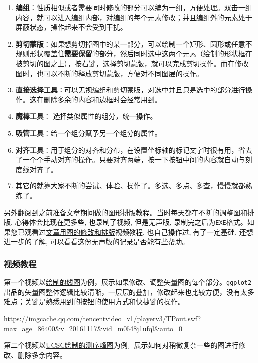 \documentclass[]{article}
\providecommand{\tightlist}{%
  \setlength{\itemsep}{0pt}\setlength{\parskip}{0pt}}
\numberwithin{figure}{section}
\numberwithin{table}{section}
\theoremstyle{definition}
\theoremstyle{definition}
\theoremstyle{definition}
\theoremstyle{remark}
\begin{document}
\begin{enumerate}
\def\labelenumi{\arabic{enumi}.}
\tightlist
\item
  \textbf{编组}：性质相似或者需要同时修改的部分可以编为一组，方便处理。双击一组内容，就可以进入编组内部，对编组的每个元素修改；并且编组外的元素处于屏蔽状态，操作起来不会受到干扰。
\item
  \textbf{剪切蒙版}：如果想剪切掉图中的某一部分，可以绘制一个矩形、圆形或任意不规则形状覆盖住\textbf{需要保留}的部分，然后同时选中这两个元素（绘制的形状框在被剪切的图之上），按右键，选择剪切蒙版，就可以完成剪切操作。而在修改图时，也可以不断的释放剪切蒙版，方便对不同图层的操作。
\item
  \textbf{直接选择工具}：可以无视编组和剪切蒙版，对选中并且只是选中的部分进行操作。这在删除多余的内容和边框时会经常用到。
\item
  \textbf{魔棒工具}： 选择类似属性的组分，统一操作。
\item
  \textbf{吸管工具}：给一个组分赋予另一个组分的属性。
\item
  \textbf{对齐工具}：用于组分的对齐和分布，在设置坐标轴的标记文字时很有用，省去了一个个手动对齐的操作。只要对齐两端，按一下按钮中间的内容就自动与刻度线对齐了。
\item
  其它的就靠大家不断的尝试、体验、操作了。多选、多点、多查，慢慢就都熟练了。
\end{enumerate}

另外翻阅到之前准备文章期间做的图形排版教程。当时每天都在不断的调整图和排版,
心得体会比现在更多些, 也录制了视频, 但是无声版,
录制完之后为\texttt{EXE}格式。如果您已观看过\href{http://mp.weixin.qq.com/s/IJNyhinakY0lSXgCN7b9ug}{文章用图的修改和排版}视频教程,
也自己操作过, 有了一定基础, 还想进一步的了解,
可以看看这份无声版的记录是否能有些帮助。

\subsubsection{视频教程}

第一个视频以\href{http://mp.weixin.qq.com/s/D0b1gBoho5bnuDdsBRpA4g}{绘制的线图}为例，展示如果修改、调整矢量图的每个部分。\texttt{ggplot2}出品的矢量图整体逻辑比较清晰，一层层的叠加，修改起来也比较方便，没有太多难点；关键是熟悉用到的按钮的使用方式和快捷键的操作。

\url{https://imgcache.qq.com/tencentvideo_v1/playerv3/TPout.swf?max_age=86400\&v=20161117\&vid=m0548j1ufql\&auto=0}

第二个视频以\href{http://mp.weixin.qq.com/s/b7Cppdm-vMTgZfFVC3Q1lQ}{UCSC绘制的测序峰图}为例，展示如何对稍微复杂一些的图进行修改、删除多余内容。
\end{document}
